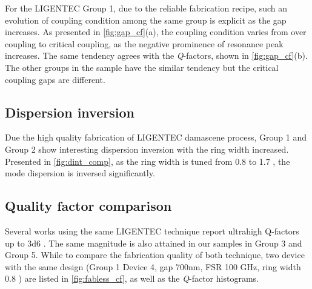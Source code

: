 For the LIGENTEC Group 1, due to the reliable fabrication recipe, such an evolution of coupling condition among the same group is explicit as the gap increases.
As presented in \autoref{fig:gap_cf}(a), the coupling condition varies from over coupling to critical coupling, as the negative prominence of resonance peak increases. The same tendency agrees with the \textit{Q}-factors, shown in \autoref{fig:gap_cf}(b). The other groups in the sample have the similar tendency but the critical coupling gaps are different.

\begin{figure}
	\centering
	
	\label{fig:gap_cf}
\end{figure}


\subsection{Dispersion inversion}

Due the high quality fabrication of LIGENTEC damascene process, Group 1 and Group 2 show interesting dispersion inversion with the ring width increased. Presented in \autoref{fig:dint_comp}, as the ring width is tuned from 0.8 \um to 1.7 \um, the mode dispersion is inversed significantly.

\begin{figure}
	\centering
	
	\mycaption{}{}
	\label{fig:dint_comp}
\end{figure}


\subsection{Quality factor comparison}


Several works using the same LIGENTEC technique report ultrahigh Q-factors up to \num{3d6} \cites{Yu2019, Vaidya2019}. The same magnitude is also attained in our samples in Group 3 and Group 5. While to compare the fabrication quality of both technique, two device with the same design (Group 1 Device 4, gap 700nm, FSR 100 GHz, ring width 0.8 \um ) are listed in \autoref{fig:fabless_cf}, as well as the \textit{Q}-factor histograms.

\begin{figure}
	\centering
	
	\label{fig:fabless_cf}
\end{figure}

